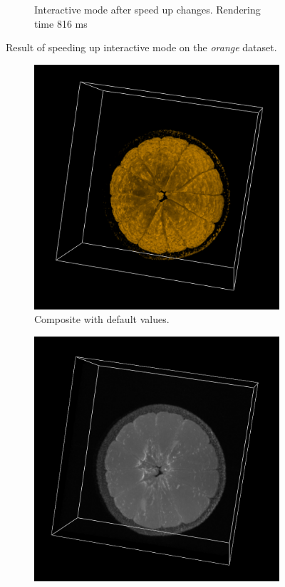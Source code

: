 \documentclass[a4paper]{article}
\begin{document}
\begin{figure}[h]
\begin{subfigure}[b]{0.45\textwidth}
    \caption{Interactive mode after speed up changes. Rendering time 816 ms}
  \end{subfigure}
  \caption{Result of speeding up interactive mode on the \textit{orange} dataset.}
  \label{fig:speedup}
\end{figure}

\begin{figure}[h]
  \centering
  \begin{subfigure}[b]{0.45\textwidth}
    \centering
    \includegraphics[width=\textwidth]{orange-composite}
    \caption{Composite with default values.}
  \end{subfigure}
  \hfill
  \begin{subfigure}[b]{0.45\textwidth}
    \centering
    \includegraphics[width=\textwidth]{orange-mips}

\end{subfigure}
\end{figure}
\end{document}
